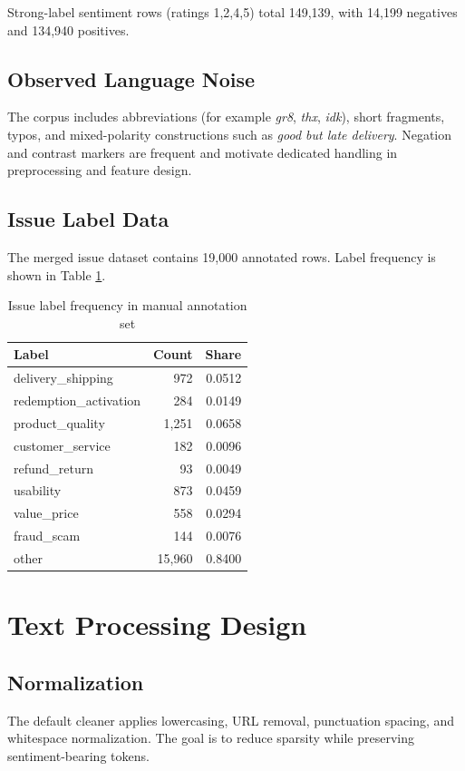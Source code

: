 \documentclass[12pt,a4paper]{article}
\begin{document}
Strong-label sentiment rows (ratings 1,2,4,5) total 149,139, with 14,199 negatives and 134,940 positives.

\subsection{Observed Language Noise}
The corpus includes abbreviations (for example \textit{gr8}, \textit{thx}, \textit{idk}), short fragments, typos, and mixed-polarity constructions such as \textit{good but late delivery}. Negation and contrast markers are frequent and motivate dedicated handling in preprocessing and feature design.

\subsection{Issue Label Data}
The merged issue dataset contains 19,000 annotated rows. Label frequency is shown in Table \ref{tab:issue_freq}.

\begin{table}[H]
\centering
\caption{Issue label frequency in manual annotation set}
\label{tab:issue_freq}
\begin{tabular}{lrr}
\toprule
Label & Count & Share \\
\midrule
delivery\_shipping & 972 & 0.0512 \\
redemption\_activation & 284 & 0.0149 \\
product\_quality & 1,251 & 0.0658 \\
customer\_service & 182 & 0.0096 \\
refund\_return & 93 & 0.0049 \\
usability & 873 & 0.0459 \\
value\_price & 558 & 0.0294 \\
fraud\_scam & 144 & 0.0076 \\
other & 15,960 & 0.8400 \\
\bottomrule
\end{tabular}
\end{table}

\section{Text Processing Design}
\subsection{Normalization}
The default cleaner applies lowercasing, URL removal, punctuation spacing, and whitespace normalization. The goal is to reduce sparsity while preserving sentiment-bearing tokens.
\end{document}
